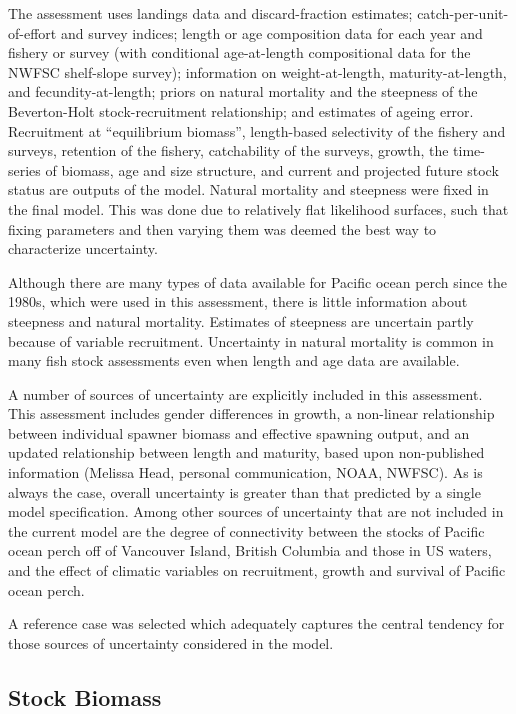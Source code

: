 \documentclass[12pt,]{article}
\begin{document}
The assessment uses landings data and discard-fraction estimates;
catch-per-unit-of-effort and survey indices; length or age composition
data for each year and fishery or survey (with conditional age-at-length
compositional data for the NWFSC shelf-slope survey); information on
weight-at-length, maturity-at-length, and fecundity-at-length; priors on
natural mortality and the steepness of the Beverton-Holt
stock-recruitment relationship; and estimates of ageing error.
Recruitment at ``equilibrium biomass'', length-based selectivity of the
fishery and surveys, retention of the fishery, catchability of the
surveys, growth, the time-series of biomass, age and size structure, and
current and projected future stock status are outputs of the model.
Natural mortality and steepness were fixed in the final model. This was
done due to relatively flat likelihood surfaces, such that fixing
parameters and then varying them was deemed the best way to characterize
uncertainty.

Although there are many types of data available for Pacific ocean perch
since the 1980s, which were used in this assessment, there is little
information about steepness and natural mortality. Estimates of
steepness are uncertain partly because of variable recruitment.
Uncertainty in natural mortality is common in many fish stock
assessments even when length and age data are available.

A number of sources of uncertainty are explicitly included in this
assessment. This assessment includes gender differences in growth, a
non-linear relationship between individual spawner biomass and effective
spawning output, and an updated relationship between length and
maturity, based upon non-published information (Melissa Head, personal
communication, NOAA, NWFSC). As is always the case, overall uncertainty
is greater than that predicted by a single model specification. Among
other sources of uncertainty that are not included in the current model
are the degree of connectivity between the stocks of Pacific ocean perch
off of Vancouver Island, British Columbia and those in US waters, and
the effect of climatic variables on recruitment, growth and survival of
Pacific ocean perch.

A reference case was selected which adequately captures the central
tendency for those sources of uncertainty considered in the model.

\subsection*{Stock Biomass}\label{stock-biomass}
\end{document}
